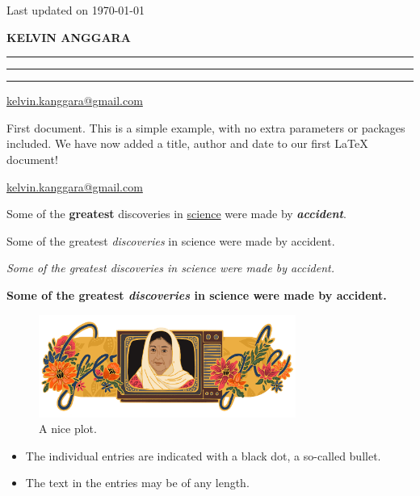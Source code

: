 \documentclass[11pt,a4paper]{article}
\begin{document}
\scriptsize\color{gray}Last updated on \today

\color{black}

\begingroup
\hfill{\MakeUppercase{\Huge\bfseries Kelvin Anggara}}\hfill
\break
\vspace{-1em}
\hrule
\vspace{0.2em}
\hrule
\hrule
\vspace{-0.5em}
\hfill\href{mailto:kelvin.kanggara@gmail.com}{kelvin.kanggara@gmail.com}\hfill
\break
\endgroup

First document. This is a simple example, with no
extra parameters or packages included.
We have now added a title, author and date to our first \LaTeX{} document!

\href{mailto:kelvin.kanggara@gmail.com}{kelvin.kanggara@gmail.com}

Some of the \textbf{greatest}
discoveries in \underline{science}
were made by \textbf{\textit{accident}}.

Some of the greatest \emph{discoveries} in science
were made by accident.

\textit{Some of the greatest \emph{discoveries}
    in science were made by accident.}

\textbf{Some of the greatest \emph{discoveries}
    in science were made by accident.}


\begin{figure}[h]
    \centering
    \includegraphics[width=0.75\textwidth]{test.png}
    \caption{A nice plot.}
    \label{fig:test}
\end{figure}

\begin{itemize}
    \item The individual entries are indicated with a black dot, a so-called bullet.
    \item The text in the entries may be of any length.
\end{itemize}
\end{document}
